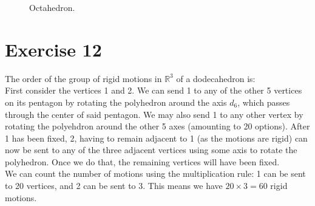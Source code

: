 \documentclass{article}
\newcommand{\R}{\mathbb{R}}
\begin{document}
\begin{figure}[H]

        \caption{\label{fig:figure1} Octahedron.}
    \end{figure}


    \section*{Exercise 12}
    The order of the group of rigid motions in $\R^3$ of a dodecahedron is: \\
    First consider the vertices 1 and 2.
    We can send 1 to any of the other 5 vertices on its pentagon by
    rotating the polyhedron around the axis $d_6$, which passes through
    the center of said pentagon. We may also send 1 to any other vertex
    by rotating the polyehdron around the other 5 axes (amounting to 20 
    options).
    After 1 has been fixed, 2, having to remain adjacent to 1 (as the
    motions are rigid) can now be sent to any of the three adjacent vertices
    using some axis to rotate the polyhedron. Once we do that, the
    remaining vertices will have been fixed. \\
    We can count the number of motions using the multiplication rule:
    1 can be sent to 20 vertices, and 2 can be sent to 3. This means we
    have $20 \times 3 = 60$ rigid motions. 
\end{document}
